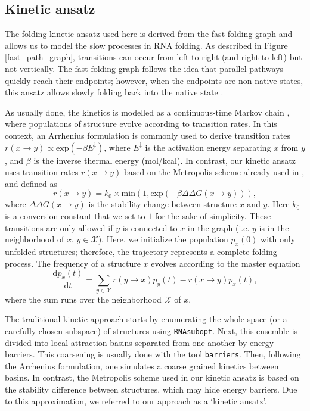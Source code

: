 \subsection*{Kinetic ansatz}
The folding kinetic ansatz used here is derived from the fast-folding graph and allows us to model the slow processes in RNA folding. As described in Figure \ref{fast_path_graph}, transitions can occur from left to right (and right to left) but not vertically. The fast-folding graph follows the idea that parallel pathways quickly reach their endpoints; however, when the endpoints are non-native states, this ansatz allows slowly folding back into the native state \cite{pan97_foldin_rna_invol_paral_pathw}. 

As usually done, the kinetics is modelled as a continuous-time Markov chain \cite{lorenz20_effic_comput_base_probab_multi_rna_foldin}, where populations of structure evolve according to transition rates. In this context, an Arrhenius formulation is commonly used to derive transition rates \(r(x \rightarrow y) \propto \text{exp}(-\beta E^{\ddagger})\), where \(E^{\ddagger}\) is the activation energy separating \(x\) from \(y\), and \(\beta\) is the inverse thermal energy (mol/kcal). In contrast, our kinetic ansatz uses transition rates \(r(x\rightarrow y)\) based on the Metropolis scheme already used in \cite{klemm2008funnels}, and defined as
\begin{equation}
\label{Eq:metropolis}
r(x\rightarrow y) = k_0 \times \text{min}(1, \text{exp}(-\beta \Delta \Delta G(x\rightarrow y))),
\end{equation}
where \(\Delta \Delta G(x\rightarrow y)\) is the stability change between structure \(x\) and \(y\). Here \(k_0\) is a conversion constant that we set to $1$ for the sake of simplicity.  These transitions are only allowed if \(y\) is connected to \(x\) in the graph (i.e. \(y\) is in the neighborhood of \(x\), \(y \in \mathcal{X}\)). Here, we initialize the population \(p_x(0)\) with only unfolded structures; therefore, the trajectory represents a complete folding process. The frequency of a structure \(x\) evolves according to the master equation
\begin{equation}
\label{Eq:kenetics}
\frac{\text{d}p_x(t)}{\text{d}t} = \sum\limits_{y \in \mathcal{X}}
r(y \rightarrow x) p_{y}(t) - r(x \rightarrow y) p_{x}(t),
\end{equation}
where the sum runs over the neighborhood \(\mathcal{X}\) of \(x\).

The traditional kinetic approach starts by enumerating the whole space (or a carefully chosen subspace) of structures using \texttt{RNAsubopt}. Next, this ensemble is divided into local attraction basins separated from one another by energy barriers. This coarsening is usually done with the tool \texttt{barriers}. Then, following the Arrhenius formulation, one simulates a coarse grained kinetics between basins. In contrast, the Metropolis scheme used in our kinetic ansatz is based on the stability difference between structures, which may hide energy barriers. Due to this approximation, we referred to our approach as a `kinetic ansatz'.

